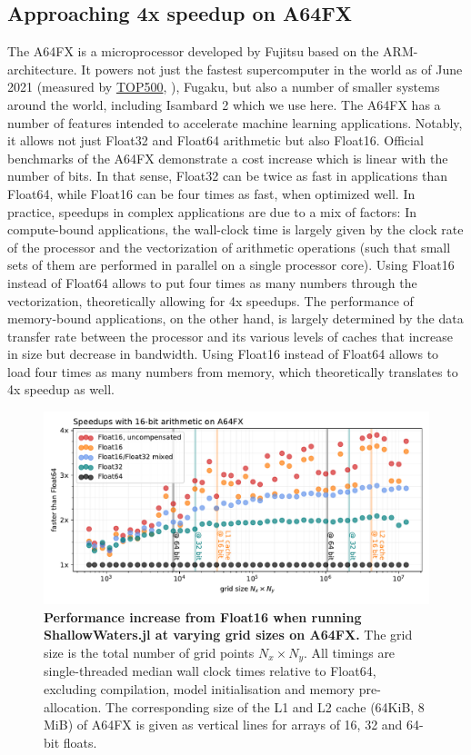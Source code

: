 \subsection{Approaching 4x speedup on A64FX}
The A64FX is a microprocessor developed by Fujitsu based on the ARM-architecture. It powers not just the fastest
supercomputer in the world as of June 2021 (measured by \href{https://top500.org}{TOP500}, \cite{Dongarra2011}),
Fugaku, but also a number of smaller systems around the world, including Isambard 2 which we use here. The A64FX
has a number of features intended to accelerate machine learning applications. Notably, it allows not just Float32 and
Float64 arithmetic but also Float16. Official benchmarks of the A64FX demonstrate a cost increase which is linear
with the number of bits. In that sense, Float32 can be twice as fast in applications than Float64, while Float16 can
be four times as fast, when optimized well. In practice, speedups in complex applications are due to a mix of factors:
In compute-bound applications, the wall-clock time is largely given by the clock rate of the processor and the
vectorization of arithmetic operations (such that small sets of them are performed in parallel on a single processor core).
Using Float16 instead of Float64 allows to put four times as many numbers through the vectorization, theoretically
allowing for 4x speedups. The performance of memory-bound applications, on the other hand, is largely determined
by the data transfer rate between the processor and its various levels of caches that increase in size but decrease
in bandwidth. Using Float16 instead of Float64 allows to load four times as many numbers from memory,
which theoretically translates to 4x speedup as well. 

\begin{figure}[tbhp]
	\includegraphics[width=1\textwidth]{Figures/a64fx/speedup.pdf}
	\caption{\textbf{Performance increase from Float16 when running ShallowWaters.jl at varying grid sizes
	on A64FX.} The grid size is the total number of grid points $N_x \times N_y$. All timings are single-threaded
	median wall clock times relative to Float64, excluding compilation, model initialisation and memory pre-allocation.
	The corresponding size of the L1 and L2 cache (64KiB, 8 MiB) of A64FX is given as vertical lines for arrays
	of 16, 32 and 64-bit floats.}
	\label{fig:a64fx_speedup}
\end{figure}

